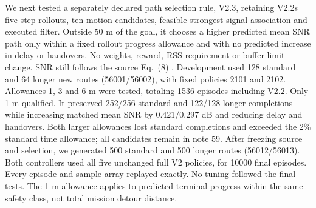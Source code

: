 We next tested a separately declared path selection rule, V2.3, retaining V2.2\textquotesingle s five step rollouts, ten motion candidates, feasible strongest signal association and executed filter. Outside 50 m of the goal, it chooses a higher predicted mean SNR path only within a fixed rollout progress allowance and with no predicted increase in delay or handovers. No weights, reward, RSS requirement or buffer limit change. SNR still follows the source Eq.~(8) \cite[p.~10, Eq.~(8); p.~15, Table~3]{thesis}.
Development used 128 standard and 64 longer new routes (56001/56002), with fixed policies 2101 and 2102. Allowances 1, 3 and 6 m were tested, totaling 1536 episodes including V2.2. Only 1 m qualified. It preserved 252/256 standard and 122/128 longer completions while increasing matched mean SNR by 0.421/0.297 dB and reducing delay and handovers. Both larger allowances lost standard completions and exceeded the 2\% standard time allowance; all candidates remain in note 59.
After freezing source and selection, we generated 500 standard and 500 longer routes (56012/56013). Both controllers used all five unchanged full V2 policies, for 10000 final episodes. Every episode and sample array replayed exactly. No tuning followed the final tests. The 1 m allowance applies to predicted terminal progress within the same safety class, not total mission detour distance.
